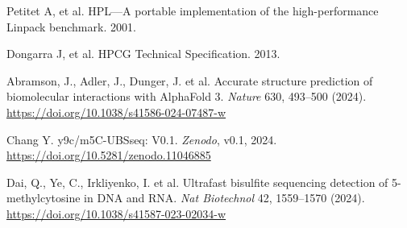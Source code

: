 \documentclass[a4paper,12pt]{article}
\begin{document}
\newpage

\begin{thebibliography}{9}

Petitet A, et al. HPL—A portable implementation of the high-performance Linpack benchmark. 2001.

Dongarra J, et al. HPCG Technical Specification. 2013.

Abramson, J., Adler, J., Dunger, J. et al. Accurate structure prediction of biomolecular interactions with AlphaFold 3. \textit{Nature} 630, 493–500 (2024). \url{https://doi.org/10.1038/s41586-024-07487-w}

Chang Y. y9c/m5C-UBSseq: V0.1. \textit{Zenodo}, v0.1, 2024. \url{https://doi.org/10.5281/zenodo.11046885}

Dai, Q., Ye, C., Irkliyenko, I. et al. Ultrafast bisulfite sequencing detection of 5-methylcytosine in DNA and RNA. \textit{Nat Biotechnol} 42, 1559–1570 (2024). \url{https://doi.org/10.1038/s41587-023-02034-w}
\end{thebibliography}
\newpage
\end{document}
